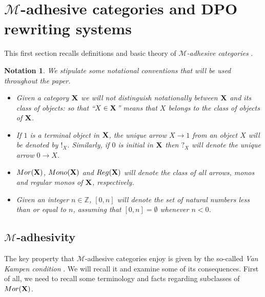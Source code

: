 \documentclass[a4paper,UKenglish,cleveref,pdftex,thm-restate,numberwithinsect,anonymous]{lipics}
\newcommand{\mor}{\mathsf{Mor}}
\newcommand{\mon}{\mathsf{Mono}}
\newcommand{\reg}{\mathsf{Reg}}
\def\X{\textbf {\textup{X}}}
\def\Set{\textbf {\textup{Set}}}
\newtheorem*{notation}{Notation}
\begin{document}
\section{$\mathcal{M}$-adhesive categories and DPO rewriting systems}\label{sec:ade}

This first section recalls definitions and basic theory of \emph{$\mathcal{M}$-adhesive categories} \cite{azzi2019essence,ehrig2012,ehrig2014adhesive,lack2005adhesive,heindel2009category}.

\begin{notation}
  We stipulate some notational conventions that will be used
  throughout the paper.
  \begin{itemize}
  \item
    Given a category $\X$ we will not distinguish notationally
    between $\X$ and its class of objects: so that ``$X\in \X$'' means
    that $X$ belongs to the class of objects of $\X$.

  \item
    If $1$ is a terminal object in $\X$, the unique
    arrow $X\to 1$ from an object $X$ will be denoted by
    $!_X$. Similarly, if $0$ is initial in $\X$ then $?_X$ will denote
    the unique arrow $0\to
    X$. %

  \item $\mor(\X)$, $\mon(\X)$ and $\reg(\X)$ will denote the class of
    all arrows, monos and regular monos of $\X$, respectively.

  \item Given an integer $n\in \mathbb{Z}$, $[0,n]$ will denote the
    set of natural numbers less than or equal to $n$, assuming that
    $[0,n]=\emptyset$ whenever $n<0$.
  \end{itemize}
\end{notation}


\subsection{$\mathcal{M}$-adhesivity}\label{subsec:ade}
The key property that $\mathcal{M}$-adhesive categories enjoy is given
by the so-called \emph{Van Kampen condition}
\cite{brown1997van,johnstone2007quasitoposes,lack2005adhesive}. We
will recall it and examine some of its consequences. First of all, we
need to recall some terminology and facts regarding subclasses of
$\mor(\X)$.
\end{document}
